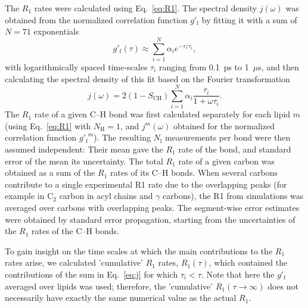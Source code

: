 \documentclass[journal=jpcbfk,manuscript=article,layout=twocolumn]{achemso}
\begin{document}
The $R_{1}$ rates were calculated using Eq.~\eqref{eq:R1}.
%
The spectral density $j(\omega)$ was obtained from the normalized correlation function $g'_\mathrm f$
by fitting it with a sum of $N=71$ exponentials
\begin{equation}
\label{eq:weights}
g'_\mathrm{f}(\tau)\approx\sum_{i=1}^{N}\alpha_{i}e^{-\tau/\tau_{i}},
\end{equation}
with logarithmically spaced time-scales $\tau_{i}$ ranging from 0.1~ps to 1~$\mu$s, 
and then calculating the spectral density of this fit
based on the Fourier transformation\cite{ferreira15}
\begin{equation}
\label{eq:j}
j{(\omega)}=2(1-S_\mathrm{CH})\sum_{i=1}^{N}\alpha_{i}\frac{\tau_{i}}{1+\omega\tau_{i}} .
\end{equation}
%
The $R_{1}$ rate of a given C--H bond was
first calculated separately for each lipid $m$ (using Eq.~\eqref{eq:R1} with $N_\mathrm{H}=1$, and $j^m(\omega)$ obtained for the normalized correlation function ${g'_\mathrm f}^m$). The resulting $N_\mathrm{l}$ measurements per bond were then assumed independent:
Their mean gave the $R_1$ rate of the bond, and 
standard error of the mean its uncertainty.
%
The total $R_1$ rate of a given carbon was obtained as a sum of the $R_1$ rates of its C--H bonds.
%
When several carbons contribute to a single experimental R1 rate due to the overlapping peaks (for example in C$_2$ carbon in acyl chains and $\gamma$ carbons),
the R1 from simulations was averaged over carbons with overlapping peaks.
%
The segment-wise error estimates were obtained by standard error propagation, starting from the uncertainties of the $R_1$ rates of the C--H bonds.

To gain insight on the time scales at which the main contributions to the $R_1$ rates arise,
we calculated 'cumulative' $R_1$ rates, $R_1(\tau)$, which
contained the contributions of the sum in Eq.~\eqref{eq:j} for which $\tau_i<\tau$.
Note that here the $g'_\mathrm{f}$ averaged over lipids was used;
therefore, the 'cumulative' $R_1(\tau\to\infty)$ does not necessarily have exactly
the same numerical value as the actual $R_1$.
\end{document}
